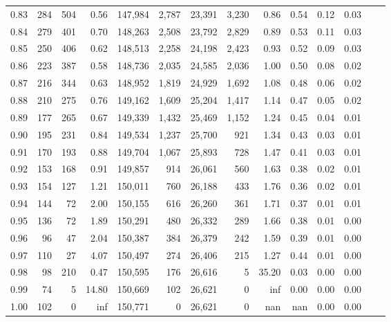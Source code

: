 \begin{tabular}{rrrrrrrrrrrrrr}
0.83 &    284 &  504 &    0.56 &  147,984 &    2,787 &  23,391 &   3,230 &   0.86 &  0.54 &  0.12 &      0.03 \\
0.84 &    279 &  401 &    0.70 &  148,263 &    2,508 &  23,792 &   2,829 &   0.89 &  0.53 &  0.11 &      0.03 \\
0.85 &    250 &  406 &    0.62 &  148,513 &    2,258 &  24,198 &   2,423 &   0.93 &  0.52 &  0.09 &      0.03 \\
0.86 &    223 &  387 &    0.58 &  148,736 &    2,035 &  24,585 &   2,036 &   1.00 &  0.50 &  0.08 &      0.02 \\
0.87 &    216 &  344 &    0.63 &  148,952 &    1,819 &  24,929 &   1,692 &   1.08 &  0.48 &  0.06 &      0.02 \\
0.88 &    210 &  275 &    0.76 &  149,162 &    1,609 &  25,204 &   1,417 &   1.14 &  0.47 &  0.05 &      0.02 \\
0.89 &    177 &  265 &    0.67 &  149,339 &    1,432 &  25,469 &   1,152 &   1.24 &  0.45 &  0.04 &      0.01 \\
0.90 &    195 &  231 &    0.84 &  149,534 &    1,237 &  25,700 &     921 &   1.34 &  0.43 &  0.03 &      0.01 \\
0.91 &    170 &  193 &    0.88 &  149,704 &    1,067 &  25,893 &     728 &   1.47 &  0.41 &  0.03 &      0.01 \\
0.92 &    153 &  168 &    0.91 &  149,857 &      914 &  26,061 &     560 &   1.63 &  0.38 &  0.02 &      0.01 \\
0.93 &    154 &  127 &    1.21 &  150,011 &      760 &  26,188 &     433 &   1.76 &  0.36 &  0.02 &      0.01 \\
0.94 &    144 &   72 &    2.00 &  150,155 &      616 &  26,260 &     361 &   1.71 &  0.37 &  0.01 &      0.01 \\
0.95 &    136 &   72 &    1.89 &  150,291 &      480 &  26,332 &     289 &   1.66 &  0.38 &  0.01 &      0.00 \\
0.96 &     96 &   47 &    2.04 &  150,387 &      384 &  26,379 &     242 &   1.59 &  0.39 &  0.01 &      0.00 \\
0.97 &    110 &   27 &    4.07 &  150,497 &      274 &  26,406 &     215 &   1.27 &  0.44 &  0.01 &      0.00 \\
0.98 &     98 &  210 &    0.47 &  150,595 &      176 &  26,616 &       5 &  35.20 &  0.03 &  0.00 &      0.00 \\
0.99 &     74 &    5 &   14.80 &  150,669 &      102 &  26,621 &       0 &    inf &  0.00 &  0.00 &      0.00 \\
1.00 &    102 &    0 &     inf &  150,771 &        0 &  26,621 &       0 &    nan &   nan &  0.00 &      0.00 \\
\bottomrule
\end{tabular}
